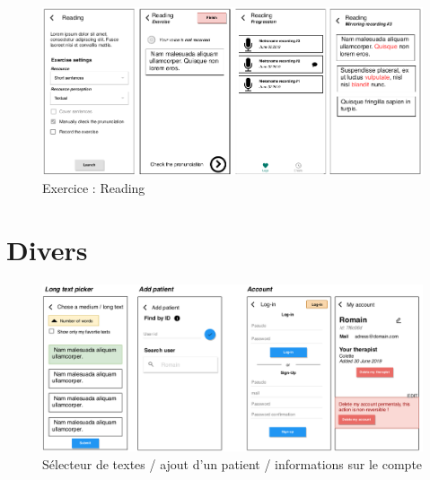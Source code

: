 \begin{appendices}
\begin{figure}[H]
  \includegraphics[width=1\linewidth]{content/imgs/maquette2d.png}
  \caption*{Exercice : Reading}
\end{figure}

\section{Divers}
\begin{figure}[H]
  \includegraphics[width=1\linewidth]{content/imgs/maquette3.png}
  \caption*{Sélecteur de textes / ajout d'un patient / informations sur le compte}
\end{figure}






\begin{landscape}

\end{landscape}
\end{appendices}
